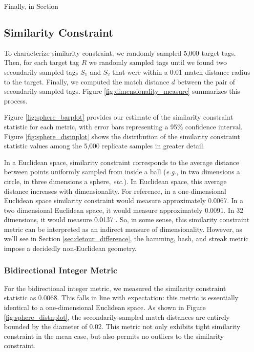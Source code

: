 Finally, in Section

\subsection{Similarity Constraint} \label{sec:similarityconstriant}



To characterize similarity constraint, we randomly sampled 5,000 target tags.
Then, for each target tag $R$ we randomly sampled tags until we found two secondarily-sampled tags $S_1$ and $S_2$ that were within a 0.01 match distance radius to the target.
Finally, we computed the match distance $d$ between the pair of secondarily-sampled tags.
Figure \ref{fig:dimensionality_measure} summarizes this process.

Figure \ref{fig:sphere_barplot} provides our estimate of the similarity constraint statistic for each metric, with error bars representing a 95\% confidence interval.
Figure \ref{fig:sphere_distnplot} shows the distribution of the similarity constraint statistic values among the 5,000 replicate samples in greater detail.

In a Euclidean space, similarity constraint corresponds to the average distance between points uniformly sampled from inside a ball (\textit{e.g.}, in two dimensions a circle, in three dimensions a sphere, \textit{etc.}).
In Euclidean space, this average distance increases with dimensionality.
For reference, in a one-dimensional Euclidean space similarity constraint would measure approximately 0.0067.
In a two dimensional Euclidean space, it would measure approximately  0.0091.
In 32 dimensions, it would measure 0.0137 \citep{dunbar1997average}.
So, in some sense, this similarity constraint metric can be interpreted as an indirect measure of dimensionality.
However, as we'll see in Section \ref{sec:detour_difference}, the hamming, hash, and streak metric impose a decidedly non-Euclidean geometry.

\subsubsection{Bidirectional Integer Metric}

For the bidirectional integer metric, we measured the similarity constraint statistic as 0.0068.
This falls in line with expectation: this metric is essentially identical to a one-dimensional Euclidean space.
As shown in Figure \ref{fig:sphere_distnplot}, the secondarily-sampled match distances are entirely bounded by the diameter of 0.02.
This metric not only exhibits tight similarity constraint in the mean case, but also permits no outliers to the similarity constraint.

